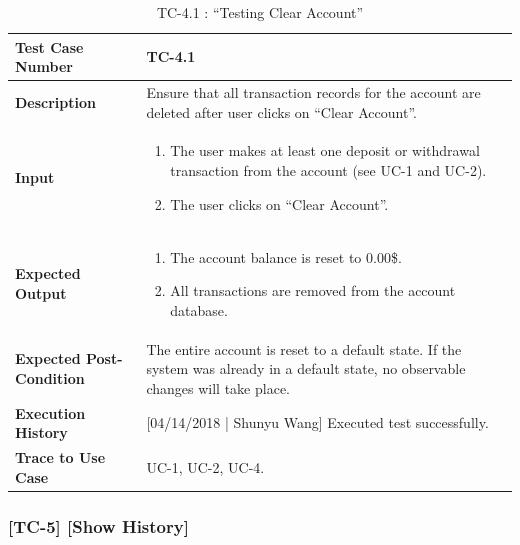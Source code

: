 \documentclass[12pt]{article}
\begin{document}
\begin{table}[H]
\caption{TC-4.1 : “Testing Clear Account”}
\begin{center}
\begin{tabular}{|p{5.5	cm}|p{11cm}|}
\hline
\bf Test Case Number & TC-4.1\\
\hline
\bf Description & Ensure that all transaction records for the account are deleted after user clicks on ``Clear Account''.\\
\hline
\bf Input &
\begin{enumerate}
\item The user makes at least one deposit or withdrawal transaction from the account (see UC-1 and UC-2).
\item The user clicks on ``Clear Account''.
\end{enumerate}
\\
\hline
\bf Expected Output &
\begin{enumerate}
\item The account balance is reset to 0.00\$.
\item All transactions are removed from the account database.
\end{enumerate}
\\
\hline
\bf Expected Post-Condition & The entire account is reset to a default state. If the system was already in a default state, no observable changes will take place.\\
\hline
\bf Execution History & [04/14/2018 | Shunyu Wang] Executed test successfully.\\
\hline
\bf Trace to Use Case & UC-1, UC-2, UC-4.\\\hline
\end{tabular}
\end{center}
\end{table}

\subsubsection{[TC-5] [Show History]} \label{tc:5}
\end{document}
